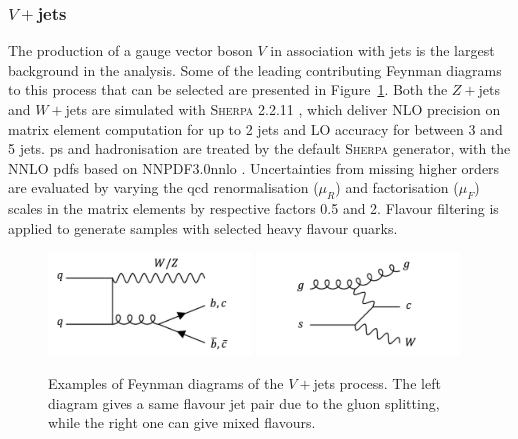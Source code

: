 \subsubsection{$V+$jets}
The production of a gauge vector boson $V$ in association with jets is the largest background in the analysis. Some of the leading contributing Feynman diagrams to this process that can be selected are presented in Figure~\ref{fig:feynVJ}. Both the $Z+$jets and $W+$jets are simulated with \textsc{Sherpa} 2.2.11 \cite{10.21468/SciPostPhys.7.3.034}, which deliver NLO precision on matrix element computation for up to 2 jets and LO accuracy for between 3 and 5 jets. \gls{ps} and hadronisation are treated by the default \textsc{Sherpa} generator, with the NNLO \gls{pdf}s based on NNPDF3.0nnlo \cite{PDFLHCrun2}. Uncertainties from missing higher orders are evaluated by varying the \gls{qcd} renormalisation ($\mu_R$) and factorisation ($\mu_F$) scales in the matrix elements by respective factors 0.5 and 2. Flavour filtering is applied to generate samples with selected heavy flavour quarks.

\begin{figure}[h!]
  \center
  \includegraphics[width=0.48\textwidth]{Images/VH/Feynman/vjet.png}
  \includegraphics[width=0.48\textwidth]{Images/VH/Feynman/vjet2.png}
  \caption{Examples of Feynman diagrams of the $V+$jets process. The left diagram gives a same flavour jet pair due to the gluon splitting, while the right one can give mixed flavours.} 
  \label{fig:feynVJ}
\end{figure}

